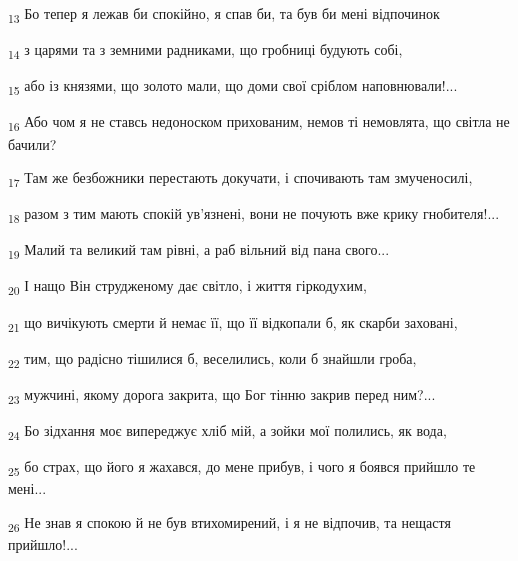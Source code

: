 \begin{tcolorbox}
\textsubscript{13} Бо тепер я лежав би спокійно, я спав би, та був би мені відпочинок
\end{tcolorbox}
\begin{tcolorbox}
\textsubscript{14} з царями та з земними радниками, що гробниці будують собі,
\end{tcolorbox}
\begin{tcolorbox}
\textsubscript{15} або із князями, що золото мали, що доми свої сріблом наповнювали!...
\end{tcolorbox}
\begin{tcolorbox}
\textsubscript{16} Або чом я не ставсь недоноском прихованим, немов ті немовлята, що світла не бачили?
\end{tcolorbox}
\begin{tcolorbox}
\textsubscript{17} Там же безбожники перестають докучати, і спочивають там змученосилі,
\end{tcolorbox}
\begin{tcolorbox}
\textsubscript{18} разом з тим мають спокій ув'язнені, вони не почують вже крику гнобителя!...
\end{tcolorbox}
\begin{tcolorbox}
\textsubscript{19} Малий та великий там рівні, а раб вільний від пана свого...
\end{tcolorbox}
\begin{tcolorbox}
\textsubscript{20} І нащо Він струдженому дає світло, і життя гіркодухим,
\end{tcolorbox}
\begin{tcolorbox}
\textsubscript{21} що вичікують смерти й немає її, що її відкопали б, як скарби заховані,
\end{tcolorbox}
\begin{tcolorbox}
\textsubscript{22} тим, що радісно тішилися б, веселились, коли б знайшли гроба,
\end{tcolorbox}
\begin{tcolorbox}
\textsubscript{23} мужчині, якому дорога закрита, що Бог тінню закрив перед ним?...
\end{tcolorbox}
\begin{tcolorbox}
\textsubscript{24} Бо зідхання моє випереджує хліб мій, а зойки мої полились, як вода,
\end{tcolorbox}
\begin{tcolorbox}
\textsubscript{25} бо страх, що його я жахався, до мене прибув, і чого я боявся прийшло те мені...
\end{tcolorbox}
\begin{tcolorbox}
\textsubscript{26} Не знав я спокою й не був втихомирений, і я не відпочив, та нещастя прийшло!...
\end{tcolorbox}
